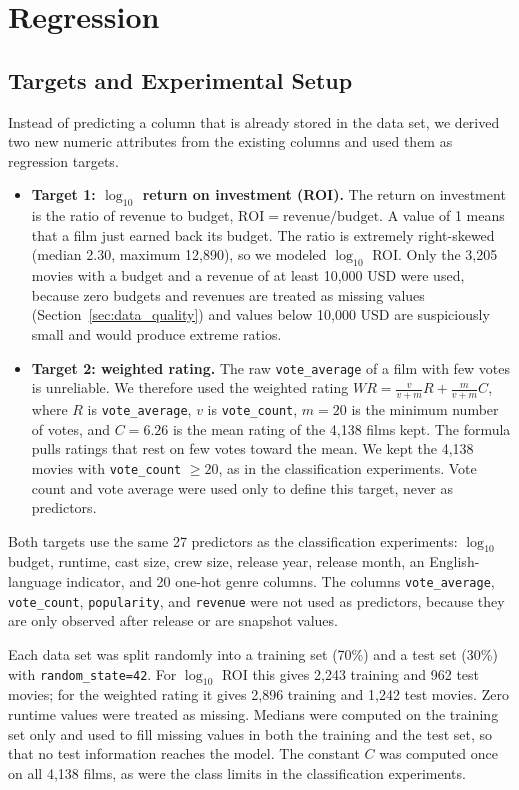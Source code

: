 \documentclass[conference]{IEEEtran}
\begin{document}
\section{Regression}\label{sec:regression}

\subsection{Targets and Experimental Setup}
Instead of predicting a column that is already stored in the data set, we derived two new numeric attributes from the existing columns and used them as regression targets.
\begin{itemize}[leftmargin=*,nosep]
  \item \textbf{Target 1: $\log_{10}$ return on investment (ROI).} The return on investment is the ratio of revenue to budget, $\text{ROI}=\text{revenue}/\text{budget}$. A value of 1 means that a film just earned back its budget. The ratio is extremely right-skewed (median 2.30, maximum 12,890), so we modeled $\log_{10}$ ROI. Only the 3,205 movies with a budget and a revenue of at least 10,000 USD were used, because zero budgets and revenues are treated as missing values (Section~\ref{sec:data_quality}) and values below 10,000 USD are suspiciously small and would produce extreme ratios.
  \item \textbf{Target 2: weighted rating.} The raw \texttt{vote\_average} of a film with few votes is unreliable. We therefore used the weighted rating $WR=\frac{v}{v+m}R+\frac{m}{v+m}C$, where $R$ is \texttt{vote\_average}, $v$ is \texttt{vote\_count}, $m=20$ is the minimum number of votes, and $C=6.26$ is the mean rating of the 4,138 films kept. The formula pulls ratings that rest on few votes toward the mean. We kept the 4,138 movies with \texttt{vote\_count} $\geq 20$, as in the classification experiments. Vote count and vote average were used only to define this target, never as predictors.
\end{itemize}
Both targets use the same 27 predictors as the classification experiments: $\log_{10}$ budget, runtime, cast size, crew size, release year, release month, an English-language indicator, and 20 one-hot genre columns. The columns \texttt{vote\_average}, \texttt{vote\_count}, \texttt{popularity}, and \texttt{revenue} were not used as predictors, because they are only observed after release or are snapshot values.

Each data set was split randomly into a training set (70\%) and a test set (30\%) with \texttt{random\_state=42}. For $\log_{10}$ ROI this gives 2,243 training and 962 test movies; for the weighted rating it gives 2,896 training and 1,242 test movies. Zero runtime values were treated as missing. Medians were computed on the training set only and used to fill missing values in both the training and the test set, so that no test information reaches the model. The constant $C$ was computed once on all 4,138 films, as were the class limits in the classification experiments.
\end{document}
